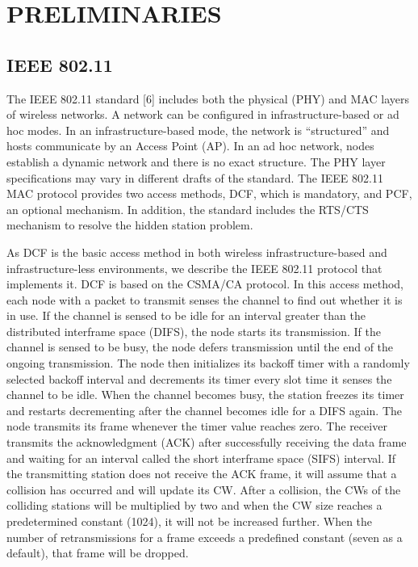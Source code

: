 \documentclass[10pt,twocolumn,oneside,submit]{JCNtran}
\begin{document}
\vspace{10pt}
\section{\uppercase{Preliminaries}}
\label{sec:prilim}
\subsection{IEEE 802.11}
\par The IEEE 802.11 standard [6] includes both the physical (PHY) and MAC layers of wireless networks. A network can be configured in infrastructure-based or ad hoc modes. In an infrastructure-based mode, the network is ``structured'' and hosts communicate by an Access Point (AP). In an ad hoc network, nodes establish a dynamic network and there is no exact structure. The PHY layer specifications may vary in different drafts of the standard. The IEEE 802.11 MAC protocol provides two access methods, DCF, which is mandatory, and PCF, an optional mechanism. In addition, the standard includes the RTS/CTS mechanism to resolve the hidden station problem.

\par As DCF is the basic access method in both wireless infrastructure-based and infrastructure-less environments, we describe the IEEE 802.11 protocol that implements it. DCF is based on the CSMA/CA protocol. In this access method, each node with a packet to transmit senses the channel to find out whether it is in use. If the channel is sensed to be idle for an interval greater than the distributed interframe space (DIFS), the node starts its transmission. If the channel is sensed to be busy, the node defers transmission until the end of the ongoing transmission. The node then initializes its backoff timer with a randomly selected backoff interval and decrements its timer every slot time it senses the channel to be idle. When the channel becomes busy, the station freezes its timer and restarts decrementing after the channel becomes idle for a DIFS again. The node transmits its frame whenever the timer value reaches zero. The receiver transmits the acknowledgment (ACK) after successfully receiving the data frame and waiting for an interval called the short interframe space (SIFS) interval. If the transmitting station does not receive the ACK frame, it will assume that a collision has occurred and will update its CW. After a collision, the CWs of the colliding stations will be multiplied by two and when the CW size reaches a predetermined constant (1024), it will not be increased further. When the number of retransmissions for a frame exceeds a predefined constant (seven as a default), that frame will be dropped.
\end{document}
